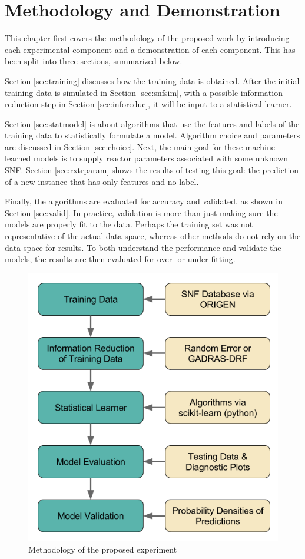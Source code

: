 \chapter{Methodology and Demonstration}
\label{ch:demo_method}

This chapter first covers the methodology of the proposed work by introducing
each experimental component and a demonstration of each component. This has been 
split into three sections, summarized below.

Section \ref{sec:training} discusses how the training data is obtained.  After
the initial training data is simulated in Section \ref{sec:snfsim}, with a
possible information reduction step in Section \ref{sec:inforeduc}, it will be
input to a statistical learner. 

Section \ref{sec:statmodel} is about algorithms that use the features and
labels of the training data to statistically formulate a model. Algorithm
choice and parameters are discussed in Section \ref{sec:choice}.  Next, the
main goal for these machine-learned models is to supply reactor parameters
associated with some unknown \gls{SNF}. Section \ref{sec:rxtrparam} shows the
results of testing this goal: the prediction of a new instance that has only
features and no label.  

Finally, the algorithms are evaluated for accuracy and validated, as shown
in Section \ref{sec:valid}. In practice, validation is more than just making sure the
models are properly fit to the data.  Perhaps the training set was not
representative of the actual data space, whereas other methods do not rely on
the data space for results. To both understand the performance and validate
the models, the results are then evaluated for over- or under-fitting. 

\begin{figure}[!htb]
  \centering
  \includegraphics[width=0.9\linewidth]{./chapters/demo_method/methodology.png}
  \caption{Methodology of the proposed experiment}
  \label{fig:method}
\end{figure}

